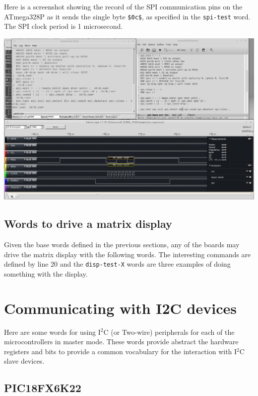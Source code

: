 \documentclass[12pt,a4paper]{article}
\newcommand{\code}[2]{
 \hrulefill
 \scriptsize
 
 \hrulefill
 \vspace{2em}
 \normalsize
}
\begin{document}
\noindent
Here is a screenshot showing the record of the SPI communication pins on the ATmega328P 
as it sends the single byte \verb!$0c$!, as specified in the \verb!spi-test! word.
The SPI clock period is 1 microsecond.

\medskip
\centerline{
\includegraphics[width=\textwidth]{../figs/eleven-spi-test-avr-sending-0c-byte.png}
}

\newpage

\subsection{Words to drive a matrix display}
\label{driving-max7219-sec}
%
Given the base words defined in the previous sections, any of the boards may drive the
matrix display with the following words.
The interesting commands are defined by line 20 and 
the \verb!disp-test-X! words are three examples of doing something with the display.

\medskip\noindent
\code{}{../avr8-2016/led-matrix-display.txt}


\newpage
\section{Communicating with I2C devices}
\label{i2c-sec}
%
Here are some words for using I$^2$C (or Two-wire) peripherals for each of the microcontrollers in master mode.
These words provide abstract the hardware registers and bits to provide a common vocabulary for the interaction
with I$^2$C slave devices.

\subsection{PIC18FX6K22}
\code{}{../pic18/i2c-base-k22.txt}
\end{document}
